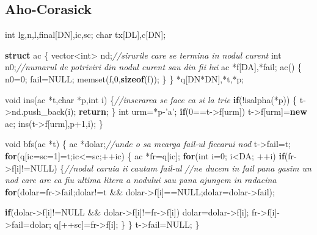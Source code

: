 \documentclass[10pt,]{article}
\newenvironment{Shaded}{}{}
\newcommand{\KeywordTok}[1]{\textcolor[rgb]{0.00,0.44,0.13}{\textbf{{#1}}}}
\newcommand{\DataTypeTok}[1]{\textcolor[rgb]{0.56,0.13,0.00}{{#1}}}
\newcommand{\DecValTok}[1]{\textcolor[rgb]{0.25,0.63,0.44}{{#1}}}
\newcommand{\CommentTok}[1]{\textcolor[rgb]{0.38,0.63,0.69}{\textit{{#1}}}}
\newcommand{\NormalTok}[1]{{#1}}
\begin{document}
\subsection{Aho-Corasick}

\begin{Shaded}
\begin{Highlighting}[]
\DataTypeTok{int} \NormalTok{lg,n,l,final[DN],ic,sc;}
\DataTypeTok{char} \NormalTok{tx[DL],c[DN];}

\KeywordTok{struct} \NormalTok{ac \{}
    \NormalTok{vector<}\DataTypeTok{int}\NormalTok{> nd;}\CommentTok{//sirurile care se termina in nodul curent}
    \DataTypeTok{int} \NormalTok{n0;}\CommentTok{//numarul de potriviri din nodul curent sau din fii lui}
    \NormalTok{ac *f[DA],*fail;}
    \NormalTok{ac() \{}
        \NormalTok{n0=}\DecValTok{0}\NormalTok{;}
        \NormalTok{fail=NULL;}
        \NormalTok{memset(f,}\DecValTok{0}\NormalTok{,}\KeywordTok{sizeof}\NormalTok{(f));}
    \NormalTok{\}}
\NormalTok{\} *q[DN*DN],*t,*p;}


\DataTypeTok{void} \NormalTok{ins(ac *t,}\DataTypeTok{char} \NormalTok{*p,}\DataTypeTok{int} \NormalTok{i) \{}\CommentTok{//inserarea se face ca si la trie}
    \KeywordTok{if}\NormalTok{(!isalpha(*p)) \{}
        \NormalTok{t->nd.push_back(i);}
        \KeywordTok{return}\NormalTok{;}
    \NormalTok{\}}
    \DataTypeTok{int} \NormalTok{urm=*p-'a';}
    \KeywordTok{if}\NormalTok{(}\DecValTok{0}\NormalTok{==t->f[urm]) t->f[urm]=}\KeywordTok{new} \NormalTok{ac;}
    \NormalTok{ins(t->f[urm],p}\DecValTok{+1}\NormalTok{,i);}
\NormalTok{\}}

\DataTypeTok{void} \NormalTok{bfs(ac *t) \{}
    \NormalTok{ac *dolar;}\CommentTok{//unde o sa mearga fail-ul fiecarui nod}
    \NormalTok{t->fail=t;}
    \KeywordTok{for}\NormalTok{(q[ic=sc=}\DecValTok{1}\NormalTok{]=t;ic<=sc;++ic) \{}
        \NormalTok{ac *fr=q[ic];}
        \KeywordTok{for}\NormalTok{(}\DataTypeTok{int} \NormalTok{i=}\DecValTok{0}\NormalTok{; i<DA; ++i) }\KeywordTok{if}\NormalTok{(fr->f[i]!=NULL) \{}\CommentTok{//nodul caruia ii cautam fail-ul}
            \CommentTok{//ne ducem in fail pana gasim un nod care are ca fiu ultima litera a nodului sau pana ajungem in radacina}
            \KeywordTok{for}\NormalTok{(dolar=fr->fail;dolar!=t && dolar->f[i]==NULL;dolar=dolar->fail);}

            \KeywordTok{if}\NormalTok{(dolar->f[i]!=NULL && dolar->f[i]!=fr->f[i]) dolar=dolar->f[i];}
            \NormalTok{fr->f[i]->fail=dolar;}
            \NormalTok{q[++sc]=fr->f[i];}
        \NormalTok{\}}
    \NormalTok{\}}
    \NormalTok{t->fail=NULL;}
\NormalTok{\}}



\end{Highlighting}
\end{Shaded}
\end{document}

